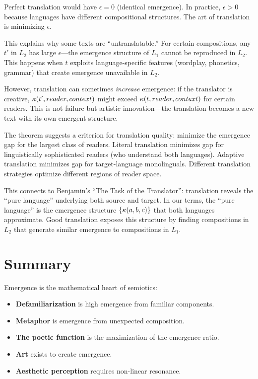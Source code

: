 \begin{interpretation}
Perfect translation would have $\epsilon = 0$ (identical emergence). In practice,
$\epsilon > 0$ because languages have different compositional structures. The
art of translation is minimizing $\epsilon$.

This explains why some texts are ``untranslatable.'' For certain compositions,
any $t'$ in $L_2$ has large $\epsilon$---the emergence structure of $L_1$ cannot
be reproduced in $L_2$. This happens when $t$ exploits language-specific features
(wordplay, phonetics, grammar) that create emergence unavailable in $L_2$.

However, translation can sometimes \emph{increase} emergence: if the translator
is creative, $\kappa(t', reader, context)$ might exceed $\kappa(t, reader, context)$
for certain readers. This is not failure but artistic innovation---the translation
becomes a new text with its own emergent structure.

The theorem suggests a criterion for translation quality: minimize the emergence
gap for the largest class of readers. Literal translation minimizes gap for
linguistically sophisticated readers (who understand both languages). Adaptive
translation minimizes gap for target-language monolinguals. Different translation
strategies optimize different regions of reader space.

This connects to Benjamin's ``The Task of the Translator'': translation reveals
the ``pure language'' underlying both source and target. In our terms, the
``pure language'' is the emergence structure $\{\kappa(a,b,c)\}$ that both
languages approximate. Good translation exposes this structure by finding
compositions in $L_2$ that generate similar emergence to compositions in $L_1$.
\end{interpretation}



\section{Summary}

Emergence is the mathematical heart of semiotics:

\begin{itemize}
  \item \textbf{Defamiliarization} is high emergence from familiar components.
  \item \textbf{Metaphor} is emergence from unexpected composition.
  \item \textbf{The poetic function} is the maximization of the emergence ratio.
  \item \textbf{Art} exists to create emergence.
  \item \textbf{Aesthetic perception} requires non-linear resonance.
\end{itemize}

